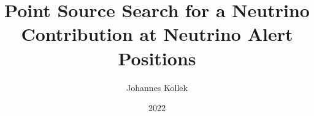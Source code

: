 \documentclass[
  tucolor,       %
  BCOR=12mm,     %
  parskip=half,  %
  open=any,      %
  cleardoublepage=plain,  %
]{tudothesis}
\author{Johannes Kollek}
\title{Point Source Search for a Neutrino Contribution at Neutrino Alert Positions}
\date{2022}
\begin{document}
\frontmatter
%
\maketitle

\makecorrectorpage


\tableofcontents

\mainmatter










%
%
%

\appendix


\backmatter
\printbibliography

\cleardoublepage

\end{document}
